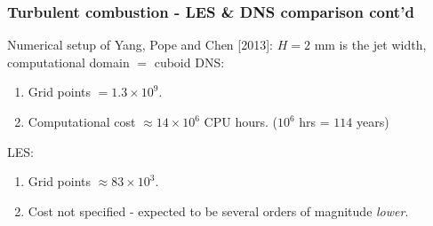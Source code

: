 \documentclass{beamer}
\begin{document}

\begin{frame}%
\frametitle{Turbulent combustion - LES \& DNS comparison cont'd}
Numerical setup of Yang, Pope and Chen [2013]:\newline
\tiny{$H = 2$ mm is the jet width, computational domain $=$ cuboid}\newline
\scriptsize
DNS: 
\begin{enumerate}[(1)]
\scriptsize
\item Grid points $ = 1.3 \times 10^9$.  
\item Computational cost $\approx 14 \times 10^6$ CPU hours. ($10^6$ hrs = $114$ years)
\end{enumerate}
LES:
\begin{enumerate}[(1)]
\scriptsize
\item Grid points $ \approx 83 \times 10^3$.  
\item Cost not specified - expected to be several orders of magnitude \textit{lower}.
\end{enumerate}
\vspace{0pt}

\begin{minipage}[0.5\textheight]{\textwidth}
\begin{columns}[T]
\hspace{-10pt}
\begin{column}{0.7\textwidth}
\vspace{-20pt}
\begin{figure}
\centering
{}
\end{figure}



\end{column}
\end{columns}
\end{minipage}
\end{frame}
\end{document}
